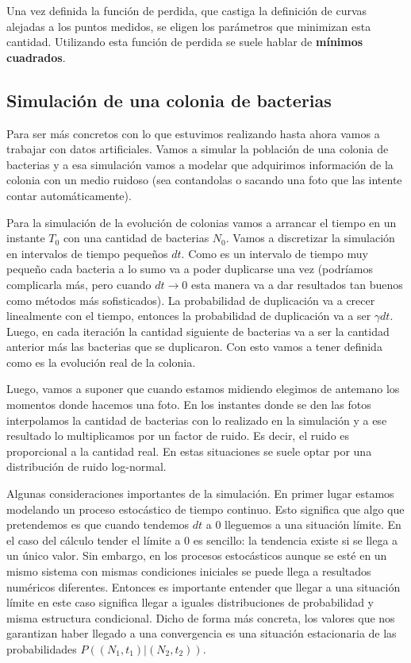 Una vez definida la funci\'on de perdida, que castiga la definici\'on de curvas alejadas a los puntos medidos, se eligen los par\'ametros que minimizan esta cantidad. Utilizando esta funci\'on de perdida se suele hablar de {\bf m\'inimos cuadrados}. 

\subsection{Simulaci\'on de una colonia de bacterias}
Para ser m\'as concretos con lo que estuvimos realizando hasta ahora vamos a trabajar con datos artificiales. Vamos a simular la poblaci\'on de una colonia de bacterias y a esa simulaci\'on vamos a modelar que adquirimos informaci\'on de la colonia con un medio ruidoso (sea contandolas o sacando una foto que las intente contar autom\'aticamente).

Para la simulaci\'on de la evoluci\'on de colonias vamos a arrancar el tiempo en un instante $T_0$ con una cantidad de bacterias $N_0$. Vamos a discretizar la simulaci\'on en intervalos de tiempo pequeños $dt$. Como es un intervalo de tiempo muy pequeño cada bacteria a lo sumo va a poder duplicarse una vez (podr\'iamos complicarla m\'as, pero cuando $dt\to 0$ esta manera va a dar resultados tan buenos como m\'etodos m\'as sofisticados). La probabilidad de duplicaci\'on va a crecer linealmente con el tiempo, entonces la probabilidad de duplicaci\'on va a ser $\gamma dt$. Luego, en cada iteraci\'on la cantidad siguiente de bacterias va a ser la cantidad anterior m\'as las bacterias que se duplicaron. 
Con esto vamos a tener definida como es la evoluci\'on real de la colonia.

Luego, vamos a suponer que cuando estamos midiendo elegimos de antemano los momentos donde hacemos una foto. En los instantes donde se den las fotos interpolamos la cantidad de bacterias con lo realizado en la simulaci\'on y a ese resultado lo multiplicamos por un factor de ruido. Es decir, el ruido es proporcional a la cantidad real. En estas situaciones se suele optar por una distribuci\'on de ruido log-normal.

Algunas consideraciones importantes de la simulaci\'on. En primer lugar estamos modelando un proceso estoc\'astico de tiempo continuo. Esto significa que algo que pretendemos es que cuando tendemos $dt$ a 0 lleguemos a una situaci\'on l\'imite. En el caso del c\'alculo tender el l\'imite a 0 es sencillo: la tendencia existe si se llega a un \'unico valor. Sin embargo, en los procesos estoc\'asticos aunque se est\'e en un mismo sistema con mismas condiciones iniciales se puede llega a resultados num\'ericos diferentes. Entonces es importante entender que llegar a una situaci\'on l\'imite en este caso significa llegar a iguales distribuciones de probabilidad y misma estructura condicional. Dicho de forma más concreta, los valores que nos garantizan haber llegado a una convergencia es una situación estacionaria de las probabilidades $P((N_1,t_1)|(N_2,t_2))$.

